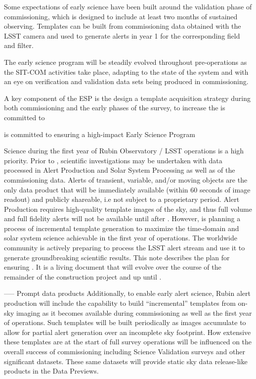 Some expectations of early science have been built around the validation phase of commissioning,  which is designed to include at least two months of sustained observing. 
Templates can be built from commissioning data obtained with the LSST camera and used to generate alerts in year 1 for the corresponding field and filter. 



The early science program will be steadily evolved throughout pre-operations as the SIT-COM activities take place, adapting to the state of the system and with an eye on verification and validation data sets being produced in commissioning.



A key component of the ESP is the design a template acquisition strategy during both commissioning and the early phases of the survey, to increase the 
is committed to	

\ro is committed to ensuring a high-impact Early Science Program



Science during the first year of Rubin Observatory / LSST operations is a high priority. 
Prior to \drone, scientific investigations may be undertaken with data processed in Alert Production and Solar System Processing as well as \dpvs of the commissioning data.
Alerts of transient, variable, and/or moving objects are the only data product that will be immediately available (within 60 seconds of image readout) and publicly shareable, i.e not subject to a proprietary period. 
Alert Production requires high-quality template images of the sky, and thus full volume and full fidelity alerts will not be available until after \drone.
However, \ro is planning a process of incremental template generation to maximize the time-domain and solar system science achievable in the first year of operations.
The worldwide community is actively preparing to process the LSST alert stream and use it to generate groundbreaking scientific results. 
This note describes the \ro plan for ensuring \es. 
It is a living document that will evolve over the course of the remainder of the construction project and up until \drone. 

-----
Prompt data products
Additionally, to enable early alert science, Rubin alert production will include the capability to build ``incremental'' templates from on-sky imaging as it becomes available during commissioning as well as the first year of operations. 
Such templates will be built periodically as images accumulate to allow for partial alert generation over an incomplete sky footprint.
How extensive these templates are at the start of full survey operations will be influenced on the overall success of commissioning including Science Validation surveys and other significant datasets. These same datasets will provide static sky data release-like products in the Data Previews. 

